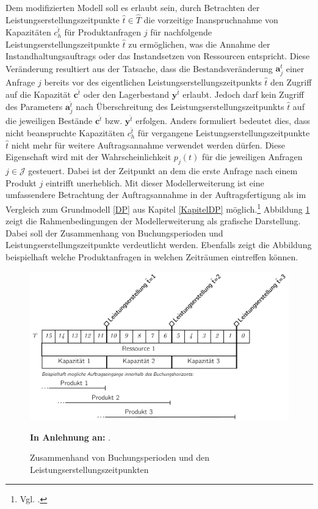 Dem modifizierten Modell soll es erlaubt sein, durch Betrachten der Leistungserstellungszeitpunkte $\hat t \in \hat T$ die vorzeitige Inanspruchnahme von Kapazitäten $c_{h}^{\hat t}$ für Produktanfragen $j$ für nachfolgende Leistungserstellungszeitpunkte $\hat{t}$ zu ermöglichen, was die Annahme der Instandhaltungsauftrags oder das Instandsetzen von Ressourcen entspricht. Diese Veränderung resultiert aus der Tatsache, dass die Bestandsveränderung $\textbf{a}_j^{\hat t}$ einer Anfrage $j$ bereits vor des eigentlichen Leistungserstellungszeitpunkts $\hat t$ den Zugriff auf die Kapazität $\textbf{c}^{\hat t}$ oder den Lagerbestand $\textbf{y}^{\hat t}$ erlaubt. Jedoch darf kein Zugriff des Parameters $\textbf{a}_j^{\hat t}$ nach Überschreitung des Leistungserstellungszeitpunkts $\hat t$ auf die jeweiligen Bestände $\textbf{c}^{\hat t}$ bzw. $\textbf{y}^{\hat t}$ erfolgen. Anders formuliert bedeutet dies, dass nicht beanspruchte Kapazitäten $c_{h}^{\hat t}$ für vergangene Leistungserstellungszeitpunkte $\hat t$ nicht mehr für weitere Auftragsannahme verwendet werden dürfen. Diese Eigenschaft wird mit der Wahrscheinlichkeit $p_j(t)$ für die jeweiligen Anfragen $j\in\mathcal{J}$ gesteuert. Dabei ist der Zeitpunkt an dem die erste Anfrage nach einem Produkt $j$ eintrifft unerheblich. Mit dieser Modellerweiterung ist eine umfassendere Betrachtung der Auftragsannahme in der Auftragsfertigung als im Vergleich zum Grundmodell \ref{DP} aus Kapitel \ref{KapitelDP} möglich.\footnote{Vgl. \cite{lars}.} Abbildung \ref{LP2} zeigt die Rahmenbedingungen der Modellerweiterung als grafische Darstellung. Dabei soll der Zusammenhang von Buchungsperioden und Leistungserstellungszeitpunkte verdeutlicht werden. Ebenfalls zeigt die Abbildung beispielhaft welche Produktanfragen in welchen Zeiträumen eintreffen können.

\begin{figure}[h!]
  \begin{center}
    \includegraphics[width=130mm]{Bilder/Leistungsperioden2.pdf}
    \caption{Zusammenhand von Buchungsperioden und den Leistungserstellungszeitpunkten}  \label{LP2}
    {\footnotesize \textbf{In Anlehnung an:} \cite{lars}}. 
  \end{center}
\end{figure}


